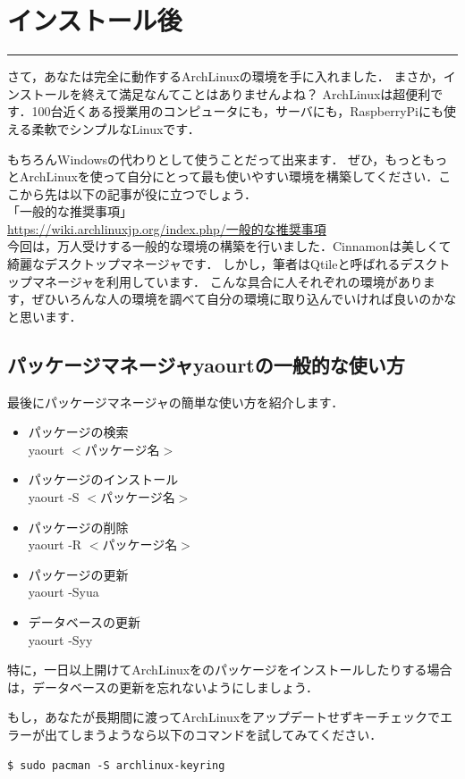 \documentclass[b5j,twoside,openany]{jsbook}
\newcommand{\linesection}[1]{\newpage \section{#1} \hrule width 150mm \vspace{3em}}
\begin{document}
\linesection{インストール後}
  さて，あなたは完全に動作するArchLinuxの環境を手に入れました．
  まさか，インストールを終えて満足なんてことはありませんよね？
  ArchLinuxは超便利です．100台近くある授業用のコンピュータにも，サーバにも，RaspberryPiにも使える柔軟でシンプルなLinuxです．

  もちろんWindowsの代わりとして使うことだって出来ます．
  ぜひ，もっともっとArchLinuxを使って自分にとって最も使いやすい環境を構築してください．ここから先は以下の記事が役に立つでしょう．\\

  「一般的な推奨事項」\\
  \url{https://wiki.archlinuxjp.org/index.php/一般的な推奨事項}\\

  今回は，万人受けする一般的な環境の構築を行いました．Cinnamonは美しくて綺麗なデスクトップマネージャです．
  しかし，筆者はQtileと呼ばれるデスクトップマネージャを利用しています．
  こんな具合に人それぞれの環境があります，ぜひいろんな人の環境を調べて自分の環境に取り込んでいければ良いのかなと思います．

  \subsection{パッケージマネージャyaourtの一般的な使い方}
  最後にパッケージマネージャの簡単な使い方を紹介します．
  \begin{itemize}
    \item パッケージの検索 \mbox{} \\
      yaourt $<$パッケージ名$>$
    \item パッケージのインストール \mbox{} \\
      yaourt -S $<$パッケージ名$>$
    \item パッケージの削除 \mbox{} \\
      yaourt -R $<$パッケージ名$>$
    \item パッケージの更新 \mbox{} \\
      yaourt -Syua
    \item データベースの更新 \mbox{} \\
      yaourt -Syy
  \end{itemize}
  特に，一日以上開けてArchLinuxをのパッケージをインストールしたりする場合は，データベースの更新を忘れないようにしましょう．

  もし，あなたが長期間に渡ってArchLinuxをアップデートせずキーチェックでエラーが出てしまうようなら以下のコマンドを試してみてください．
  \begin{screen}
\begin{verbatim}
$ sudo pacman -S archlinux-keyring
\end{verbatim}
  \end{screen}
\end{document}
